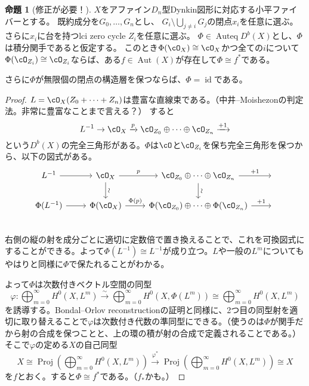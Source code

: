 \documentclass[uplatex, a4paper, dvipdfmx]{jsarticle}
\theoremstyle{definition}
\newtheorem{proposition}[theorem]{命題}
\DeclareMathOperator{\Auteq}{\mathrm{Auteq}}
\DeclareMathOperator{\id}{\mathrm{id}}
\DeclareMathOperator{\Aut}{\mathrm{Aut}}
\DeclareMathOperator{\Proj}{\mathrm{Proj}}
\begin{document}
\begin{proposition}[修正が必要！]
    $X$をアファイン$D_n$型Dynkin図形に対応する小平ファイバーとする。
    既約成分を$G_0, \dots, G_n$とし、
    $G_i \setminus \bigcup_{j \neq i}G_j$の閉点$x_i$を任意に選ぶ。
    さらに$x_i$に台を持つlci zero cycle $Z_i$を任意に選ぶ。
    $\Phi \in \Auteq D^b(X)$とし、$\Phi$は積分関手であると仮定する。
    このとき$\Phi(\cO_X) \cong \cO_X$かつ全ての$i$について$\Phi(\cO_{Z_i}) \cong \cO_{Z_i}$ならば、ある$f \in \Aut(X)$が存在して$\Phi \cong f^*$である。

    さらに$\Phi$が無限個の閉点の構造層を保つならば、$\Phi = \id$である。
\end{proposition}
\begin{proof}
    $L = \cO_X(Z_0 + \cdots + Z_n)$は豊富な直線束である。（中井--Moishezonの判定法。非常に豊富なことまで言える？）
    すると
    \begin{equation}\label{eq:exact-triangle-of-very-ample-line-bundle}
        L^{-1} \to \cO_X \xrightarrow{p} \cO_{Z_0} \oplus \cdots \oplus \cO_{Z_n}\xrightarrow{+1}
    \end{equation}
    という$D^b(X)$の完全三角形がある。$\Phi$は$\cO$と$\cO_{Z_i}$を保ち完全三角形を保つから、以下の図式がある。
    \[
        \begin{tikzcd}
            L^{-1} \ar[r] & \cO_X \ar[r, "p"] \ar[d, "\sim", sloped] & \cO_{Z_0} \oplus \cdots \oplus \cO_{Z_n} \ar[r, "+1"]\ar[d, "\sim", sloped] &{}\\
            \Phi(L^{-1}) \ar[r] & \Phi(\cO_X) \ar[r, "\Phi(p)"] & \Phi(\cO_{Z_0}) \oplus \cdots \oplus \Phi(\cO_{Z_n}) \ar[r, "+1"] &{}\\
        \end{tikzcd}
    \]
    右側の縦の射を成分ごとに適切に定数倍で置き換えることで、これを可換図式にすることができる。よって$\Phi(L^{-1}) \cong L^{-1}$が成り立つ。$L$や一般の$L^m$についてもやはり\cite{MR3182005}と同様に$\Phi$で保たれることがわかる。

    よって$\Phi$は次数付きベクトル空間の同型
    \begin{equation}
        \varphi \colon \bigoplus_{m = 0}^\infty H^0(X, L^m) \xrightarrow{\sim} \bigoplus_{m = 0}^\infty H^0(X, \Phi(L^m)) \cong \bigoplus_{m = 0}^\infty H^0(X, L^m)
    \end{equation}
    を誘導する。Bondal--Orlov reconstructionの証明\cite{MR1818984}と同様に、2つ目の同型射を適切に取り替えることで$\varphi$は次数付き代数の準同型にできる。（使うのは$\Phi$が関手だから射の合成を保つことと、上の環の積が射の合成で定義されることである。）そこで$\varphi$の定める$X$の自己同型
    \begin{equation}
        X \cong \Proj(\bigoplus_{m = 0}^\infty H^0(X, L^m)) \xrightarrow{\varphi^*} \Proj(\bigoplus_{m = 0}^\infty H^0(X, L^m)) \cong X
    \end{equation}
    を$f$とおく。すると$\Phi \cong f^*$である。（$f_*$かも。）


\end{proof}
\end{document}
